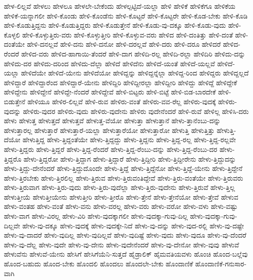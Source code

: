 {ಹೇಳ-ಲಿಲ್ಲವೆ
ಹೇಳಲು
ಹೇಳಲೂ
ಹೇಳಲೇ-ಬೇಕೆಂದು
ಹೇಳಲ್ಪಟ್ಟಿದೆ-ಯಲ್ಲಾ
ಹೇಳಿ
ಹೇಳಿಕೆ
ಹೇಳಿಕೆಗೂ
ಹೇಳಿಕೆಯ
ಹೇಳಿಕೆ-ಯನ್ನಾಗಲೀ
ಹೇಳಿ-ಕೊಂಡು
ಹೇಳಿ-ಕೊಂಡೆನು
ಹೇಳಿ-ಕೊಟ್ಟರೆ
ಹೇಳಿ-ಕೊಟ್ಟರೇ
ಹೇಳಿ-ಕೊಡ-ಬೇಕು
ಹೇಳಿ-ಕೊಡಿ
ಹೇಳಿ-ಕೊಡುತ್ತಿದ್ದನು
ಹೇಳಿ-ಕೊಡುತ್ತಿದ್ದರು
ಹೇಳಿ-ಕೊಡುತ್ತೇನೆ
ಹೇಳಿ-ಕೊಡು-ವು-ದಕ್ಕೂ
ಹೇಳಿ-ಕೊಡು-ವುದು
ಹೇಳಿ-ಕೊಳ್ಳಲಿ
ಹೇಳಿ-ಕೊಳ್ಳುತ್ತಿರು-ವರು
ಹೇಳಿ-ಕೊಳ್ಳುತ್ತೀರಿ
ಹೇಳಿ-ಕೊಳ್ಳುವ-ವರು
ಹೇಳಿದ
ಹೇಳಿ-ದಂತಿತ್ತು
ಹೇಳಿ-ದಂತೆ
ಹೇಳಿ-ದಂತೆಯೇ
ಹೇಳಿ-ದನಲ್ಲವೆ
ಹೇಳಿ-ದನು
ಹೇಳಿ-ದನೋ
ಹೇಳಿ-ದರಲ್ಲವೆ
ಹೇಳಿ-ದರು
ಹೇಳಿ-ದರೂ
ಹೇಳಿದರೆ
ಹೇಳಿದ-ರೆಂದರೆ
ಹೇಳಿದ-ವರು
ಹೇಳಿದ-ಹಾಗಾಯಿ-ತೆಂದರೆ
ಹೇಳಿ-ದಾಗ
ಹೇಳಿದಿ-ರಲ್ಲ
ಹೇಳಿದಿ-ರಲ್ಲಾ
ಹೇಳಿದಿರಿ
ಹೇಳಿದು-ದನ್ನು
ಹೇಳಿದು-ದರ
ಹೇಳಿದು-ದರಿಂದ
ಹೇಳಿದು-ದೆಲ್ಲಾ
ಹೇಳಿದೆ
ಹೇಳಿದೆನು
ಹೇಳಿದೆ-ಯಂತೆ
ಹೇಳಿದೆ-ಯಲ್ಲವೆ
ಹೇಳಿದೆ-ಯಲ್ಲಾ
ಹೇಳಿದೆಯೇ
ಹೇಳಿದೆ-ಯೇನು
ಹೇಳಿದೆಯೋ
ಹೇಳಿದ್ದನ್ನು
ಹೇಳಿದ್ದನ್ನೆಲ್ಲಾ
ಹೇಳಿದ್ದ-ರಿಂದ
ಹೇಳಿದ್ದರು
ಹೇಳಿದ್ದಲ್ಲದೆ
ಹೇಳಿದ್ದಾರೆ
ಹೇಳಿದ್ದಾರೆಂದ
ಹೇಳಿದ್ದಾರೆ-ಯೇನು
ಹೇಳಿದ್ದಿರಿ
ಹೇಳಿದ್ದೀರಲ್ಲಾ
ಹೇಳಿದ್ದೀರಿ
ಹೇಳಿದ್ದು
ಹೇಳಿದ್ದೆ
ಹೇಳಿದ್ದೇಕೆ
ಹೇಳಿದ್ದೇನು
ಹೇಳಿದ್ದೇನೆ
ಹೇಳಿದ್ದೇ-ನೆಂದರೆ
ಹೇಳಿದ್ದೇವೆ
ಹೇಳಿ-ಬಿಟ್ಟರು
ಹೇಳಿ-ಬಿಟ್ಟೆ
ಹೇಳಿ-ಬಿಡ-ಬಾರದೇಕೆ
ಹೇಳಿ-ಬಿಡುತ್ತೇನೆ
ಹೇಳಿಯೂ
ಹೇಳಿರ-ಲಿಲ್ಲವೆ
ಹೇಳಿ-ರುವ
ಹೇಳಿರು-ವಂತೆ
ಹೇಳಿರು-ವವ-ರೆಲ್ಲ
ಹೇಳಿರು-ವುದಕ್ಕೆ
ಹೇಳಿರು-ವುದನ್ನು
ಹೇಳಿರು-ವುದರ
ಹೇಳಿರು-ವುದು
ಹೇಳಿರು-ವುದೇನು
ಹೇಳಿರು ವುದೇನೆಂದರೆ
ಹೇಳಿ-ರುವೆ
ಹೇಳಿಲ್ಲ
ಹೇಳಿಸಿ-ದರು
ಹೇಳು
ಹೇಳುತ್ತ
ಹೇಳುತ್ತದೆ
ಹೇಳುತ್ತವೆ
ಹೇಳುತ್ತ-ವೆಯೋ
ಹೇಳುತ್ತಾ
ಹೇಳುತ್ತಾನೆ
ಹೇಳು-ತ್ತಾನೆಂಬು-ದನ್ನು
ಹೇಳುತ್ತಾರಲ್ಲ
ಹೇಳುತ್ತಾರೆ
ಹೇಳುತ್ತಾರೆ-ಯಲ್ಲಾ
ಹೇಳುತ್ತಾರೆಯೋ
ಹೇಳುತ್ತಾರೋ
ಹೇಳುತ್ತಿ
ಹೇಳುತ್ತಿತ್ತು
ಹೇಳುತ್ತಿ-ದೆಯೋ
ಹೇಳುತ್ತಿದ್ದ
ಹೇಳು-ತ್ತಿದ್ದಂತೆಯೇ
ಹೇಳು-ತ್ತಿದ್ದದ್ದು
ಹೇಳು-ತ್ತಿದ್ದನು
ಹೇಳು-ತ್ತಿದ್ದ-ರಲ್ಲ
ಹೇಳು-ತ್ತಿದ್ದ-ರಲ್ಲವೇ
ಹೇಳು-ತ್ತಿದ್ದರು
ಹೇಳು-ತ್ತಿದ್ದರೆ
ಹೇಳು-ತ್ತಿದ್ದ-ರೆಂದರೆ
ಹೇಳು-ತ್ತಿದ್ದ-ರೆಂಬು-ದನ್ನು
ಹೇಳು-ತ್ತಿದ್ದ-ರೆಂಬು-ದರ
ಹೇಳು-ತ್ತಿದ್ದರೊ
ಹೇಳು-ತ್ತಿದ್ದರೋ
ಹೇಳು-ತ್ತಿದ್ದಾಗ
ಹೇಳು-ತ್ತಿದ್ದಾರೆ
ಹೇಳು-ತ್ತಿದ್ದೀರಿ
ಹೇಳು-ತ್ತಿದ್ದೀರೇನು
ಹೇಳು-ತ್ತಿದ್ದುದನ್ನು
ಹೇಳು-ತ್ತಿದ್ದು-ದೇನೆಂದರೆ
ಹೇಳು-ತ್ತಿದ್ದುದೊಂದೇ
ಹೇಳು-ತ್ತಿದ್ದೆ
ಹೇಳು-ತ್ತಿದ್ದೆನೋ
ಹೇಳು-ತ್ತಿದ್ದೆ-ಯೇನು
ಹೇಳು-ತ್ತಿದ್ದೇನೆ
ಹೇಳು-ತ್ತಿರಬೇಕು
ಹೇಳು-ತ್ತಿರಲಿಲ್ಲ
ಹೇಳು-ತ್ತಿರುವ
ಹೇಳು-ತ್ತಿರುವಂತಿದ್ದೇವೆ
ಹೇಳು-ತ್ತಿರು-ವಂತೆಯೇ
ಹೇಳು-ತ್ತಿರುವರು
ಹೇಳು-ತ್ತಿರುವಾಗ
ಹೇಳು-ತ್ತಿರು-ವುದು
ಹೇಳು-ತ್ತಿರು-ವುದೆಲ್ಲಾ
ಹೇಳು-ತ್ತಿರು-ವುದೇನು
ಹೇಳು-ತ್ತಿರುವೆ
ಹೇಳು-ತ್ತಿಲ್ಲ
ಹೇಳುತ್ತೀಯೆ
ಹೇಳುತ್ತೀಯೇನು
ಹೇಳುತ್ತೀರಿ
ಹೇಳು-ತ್ತೀರೊ
ಹೇಳು-ತ್ತೇನೆ
ಹೇಳು-ತ್ತೇನೆಯೋ
ಹೇಳು-ತ್ತೇವೆ
ಹೇಳುವ
ಹೇಳು-ವಂತಹ
ಹೇಳು-ವಂತೆ
ಹೇಳು-ವನು
ಹೇಳು-ವರಲ್ಲ
ಹೇಳು-ವರು
ಹೇಳು-ವರೋ
ಹೇಳು-ವಳು
ಹೇಳು-ವಷ್ಟು
ಹೇಳು-ವಾಗ
ಹೇಳು-ವಿರಲ್ಲ
ಹೇಳು-ವಿರಿ
ಹೇಳು-ವುದಕ್ಕಾಗಲೀ
ಹೇಳು-ವುದಕ್ಕಾ-ಗುವು-ದಿಲ್ಲ
ಹೇಳು-ವುದಕ್ಕಾ-ಗುವು-ದಿಲ್ಲವೇ
ಹೇಳು-ವು-ದಕ್ಕೂ
ಹೇಳು-ವುದಕ್ಕೆ
ಹೇಳು-ವುದಕ್ಕೇ-ನಿದೆ
ಹೇಳು-ವು-ದನ್ನು
ಹೇಳು-ವುದ-ರಲ್ಲಿ
ಹೇಳು-ವು-ದಷ್ಟೇ
ಹೇಳು-ವು-ದಾದರೆ
ಹೇಳು-ವುದಿಲ್ಲ
ಹೇಳು-ವುದಿಲ್ಲವೆ
ಹೇಳು-ವುದಿಷ್ಟೆ
ಹೇಳು-ವುದು
ಹೇಳು-ವುದೂ
ಹೇಳು-ವು-ದೆಂದರೆ
ಹೇಳು-ವು-ದೆಲ್ಲ
ಹೇಳು-ವುದೇ
ಹೇಳು-ವು-ದೇನು
ಹೇಳು-ವುದೇನೆಂದರೆ
ಹೇಳು-ವು-ದೇನೋ
ಹೇಳು-ವುವು
ಹೇಳುವೆ
ಹೇಳುವೆನು
ಹೇಳುವೆ-ಯೇನು
ಹೇಸಿಗೆ
ಹೇಸಿಗೆಯೆನಿ-ಸುತ್ತದೆ
ಹೈಡ್ರಾಲಿಕ್
ಹೈಮವತಿಯವಳು
ಹೊಂಚಿ
ಹೊಂದ-ಬಲ್ಲೆವು
ಹೊಂದ-ಬಹುದು
ಹೊಂದ-ಬೇಕು
ಹೊಂದಲಿ
ಹೊಂದಲು
ಹೊಂದಲೇ-ಬೇಕು
ಹೊಂದಾಣಿಕೆ
ಹೊಂದಾಣಿಕೆ-ಗನುಸಾರ-ವಾಗಿ
}
